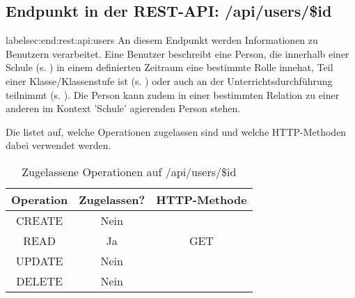 \subsection{Endpunkt in der REST-API: /api/users/\$id}
label{sec:end:rest:api:users}
An diesem Endpunkt werden Informationen zu Benutzern verarbeitet. Eine Benutzer beschreibt eine Person, die innerhalb einer Schule (s. ) in einem definierten Zeitraum eine bestimmte Rolle innehat, Teil einer Klasse/Klassenstufe ist (s. ) oder auch an der Unterrichtsdurchführung teilnimmt (s. ). Die Person kann zudem in einer bestimmten Relation zu einer anderen im Kontext 'Schule' agierenden Person stehen.

Die  listet auf, welche Operationen zugelassen sind und welche HTTP-Methoden dabei verwendet werden. 

\begin{table}[!htbp]
	\begin{tabular}{|c|c|c|}
		\hline
			\textbf{Operation} & \textbf{Zugelassen?} & \textbf{HTTP-Methode} \\ \hline
			CREATE & Nein &  \\ \hline 
			READ & Ja & GET \\ \hline
			UPDATE & Nein & \\ \hline 
			DELETE & Nein & \\ \hline
	\end{tabular}

		\caption{Zugelassene Operationen auf /api/users/\$id}
		\label{tab:rest:api:users:id:meth}
\end{table}

